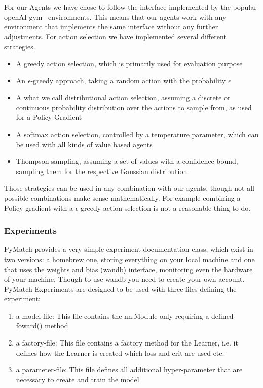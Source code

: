 \documentclass[11pt,a4paper]{article}
\begin{document}
	
	For our Agents we have chose to follow the interface implemented by the popular openAI gym~\cite{openai_gym_nodate} environments.
	This means that our agents work with any environment that implements the same interface without any further adjustments.
	For action selection we have implemented several different strategies.
	\begin{itemize}
		\item A greedy action selection, which is primarily used for evaluation purpose
		\item An $\epsilon$-greedy approach, taking a random action with the probability $\epsilon$
		\item A what we call distributional action selection, assuming a discrete or continuous probability distribution over the actions to sample from, as used for a Policy Gradient
		\item A softmax action selection, controlled by a temperature parameter, which can be used with all kinds of value based agents
		\item Thompson sampling, assuming a set of values with a confidence bound, sampling them for the respective Gaussian distribution
	\end{itemize}
	Those strategies can be used in any combination with our agents, though not all possible combinations make sense mathematically.
	For example combining a Policy gradient with a $\epsilon$-greedy-action selection is not a reasonable thing to do.

	\subsubsection{Experiments}
	PyMatch provides a very simple experiment documentation class, which exist in two versions: a homebrew one, storing everything on your local machine and one that uses the weights and bias (wandb) interface, monitoring even the hardware of your machine.
	Though to use wandb you need to create your own account.
	PyMatch Experiments are designed to be used with three files defining the experiment:
	\begin{enumerate}
		\item a model-file: This file contains the nn.Module only requiring a defined foward() method
    	\item a factory-file: This file contains a factory method for the Learner, i.e. it defines how the Learner is created which loss and crit are used etc.
    	\item a parameter-file: This file defines all additional hyper-parameter that are necessary to create and train the model
	\end{enumerate}
\end{document}
